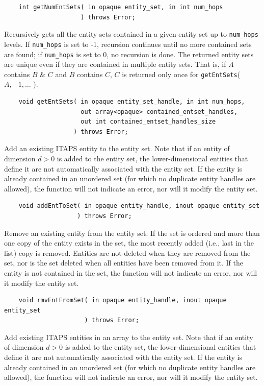 \documentclass{article}
\begin{document}
\begin{verbatim}
    int getNumEntSets( in opaque entity_set, in int num_hops
                     ) throws Error;
\end{verbatim}

Recursively gets all the entity sets contained in a given entity 
set up to {\tt num\_hops} levels. If {\tt num\_hops} is set to -1, recursion 
continues until no more contained sets are found; if {\tt num\_hops} 
is set to 0, no recursion is done. The returned entity 
sets are unique even if they are contained in multiple entity 
sets. That is, if $A$ contains $B$ \& $C$ and $B$ contains $C$, $C$ is returned 
only once for {\tt getEntSets}($A, -1, \dots$ ).

\begin{verbatim}
    void getEntSets( in opaque entity_set_handle, in int num_hops,
                     out array<opaque> contained_entset_handles,
                     out int contained_entset_handles_size
                   ) throws Error;
\end{verbatim}

Add an existing ITAPS entity to the entity set. Note that if an 
entity of dimension $d>0$ is added to the entity set, the 
lower-dimensional entities that define it are not automatically 
associated with the entity set. If the entity is already contained 
in an unordered set (for which no duplicate entity handles are 
allowed), the function will not indicate an error, nor will it 
modify the entity set.

\begin{verbatim}
    void addEntToSet( in opaque entity_handle, inout opaque entity_set
                    ) throws Error;
\end{verbatim}

Remove an existing entity from the entity set. If the 
set is ordered and more than one copy of the entity exists in 
the set, the most recently added (i.e., last in the list) copy 
is removed. Entities are not deleted when they are removed from 
the set, nor is the set deleted when all entities have been removed 
from it. If the entity is not contained in the set, the function 
will not indicate an error, nor will it modify the entity set.

\begin{verbatim}
    void rmvEntFromSet( in opaque entity_handle, inout opaque entity_set
                      ) throws Error;
\end{verbatim}


Add existing ITAPS entities in an array to the entity set. 
Note that if an entity of dimension $d>0$ is added to the 
entity set, the lower-dimensional entities that define it are 
not automatically associated with the entity set. If the entity 
is already contained in an unordered set (for which no duplicate 
entity handles are allowed), the function will not indicate an 
error, nor will it modify the entity set.
\end{document}
